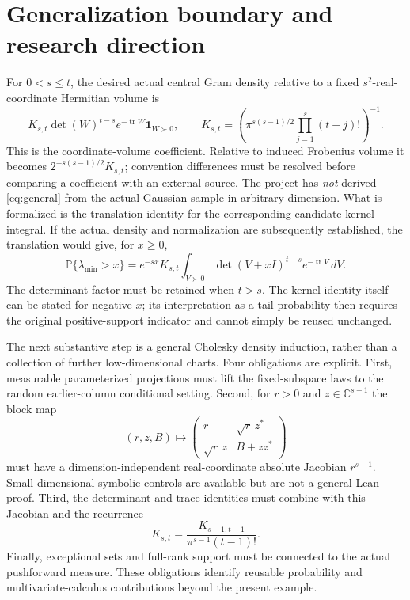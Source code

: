 \documentclass[11pt]{article}
\newcommand{\C}{\mathbb C}
\newcommand{\Prob}{\mathbb P}
\newcommand{\tr}{\operatorname{tr}}
\newcommand{\pd}{\succ0}
\begin{document}
\section{Generalization boundary and research direction}\label{sec:future}
For $0<s\leq t$, the desired actual central Gram density relative to a fixed
$s^2$-real-coordinate Hermitian volume is
\begin{equation}\label{eq:general}
 K_{s,t}\det(W)^{t-s}e^{-\tr W}\mathbf1_{W\pd},\qquad
 K_{s,t}=\left(\pi^{s(s-1)/2}\prod_{j=1}^s(t-j)!\right)^{-1}.
\end{equation}
This is the coordinate-volume coefficient. Relative to induced Frobenius
volume it becomes $2^{-s(s-1)/2}K_{s,t}$; convention differences must be
resolved before comparing a coefficient with an external source.
The project has \emph{not} derived \eqref{eq:general} from the actual Gaussian
sample in arbitrary dimension. What is formalized is the translation identity
for the corresponding candidate-kernel integral. If the actual density and
normalization are subsequently established, the translation would give, for
$x\geq0$,
\[
 \Prob\{\lambda_{\min}>x\}
 =e^{-sx}K_{s,t}\int_{V\pd}
                \det(V+xI)^{t-s}e^{-\tr V}\,dV.
\]
The determinant factor must be retained when $t>s$. The kernel identity itself
can be stated for negative $x$; its interpretation as a tail probability then
requires the original positive-support indicator and cannot simply be reused
unchanged.

The next substantive step is a general Cholesky density induction, rather than
a collection of further low-dimensional charts. Four obligations are explicit.
First, measurable parameterized projections must lift the fixed-subspace laws
to the random earlier-column conditional setting. Second, for $r>0$ and
$z\in\C^{s-1}$ the block map
\[
 (r,z,B)\longmapsto
 \begin{pmatrix}r&\sqrt r\,z^*\\\sqrt r\,z&B+zz^*\end{pmatrix}
\]
must have a dimension-independent real-coordinate absolute Jacobian
$r^{s-1}$. Small-dimensional symbolic controls are available but are not a
general Lean proof. Third, the determinant and trace identities must combine
with this Jacobian and the recurrence
\[
 K_{s,t}=\frac{K_{s-1,t-1}}{\pi^{s-1}(t-1)!}.
\]
Finally, exceptional sets and full-rank support must be connected to the
actual pushforward measure. These obligations identify reusable probability
and multivariate-calculus contributions beyond the present example.
\end{document}
